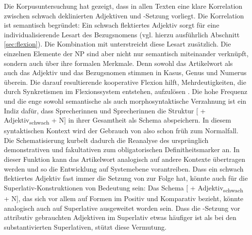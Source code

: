 Die Korpusuntersuchung hat gezeigt, dass in allen Texten eine klare Korrelation zwischen schwach deklinierten Adjektiven und -Setzung vorliegt. Die Korrelation ist semantisch begründet: Ein schwach flektiertes Adjektiv sorgt für eine individualisierende Lesart des Bezugsnomens (vgl. hierzu ausführlich Abschnitt \ref{sec:flexion}). Die Kombination mit  unterstreicht diese Lesart zusätzlich.  Die einzelnen Elemente der NP sind aber nicht nur semantisch miteinander verknüpft, sondern auch über ihre formalen Merkmale. Denn sowohl das Artikelwort als auch das Adjektiv und das Bezugsnomen stimmen in Kasus, Genus und Numerus überein. Die darauf resultierende kooperative Flexion hilft, Mehrdeutigkeiten, die durch Synkretismen im Flexionssystem entstehen, aufzulösen \parencite[127]{Szczepaniak2010}. Die hohe Frequenz und die enge sowohl semantische als auch morphosyntaktische Verzahnung ist ein Indiz dafür, dass Sprecherinnen und Sprecherinnen die Struktur [ + Adjektiv\textsubscript{schwach} + N] in ihrer Gesamtheit als Schema abspeichern. In diesem syntaktischen Kontext wird der Gebrauch von  also schon früh zum Normalfall. Die Schematisierung kurbelt dadurch die Reanalyse des ursprünglich demonstrativen und fakultativen  zum obligatorischen Definitheitsmarker an. In dieser Funktion kann das Artikelwort analogisch auf andere Kontexte übertragen werden und so die Entwicklung auf Systemebene vorantreiben. Dass ein schwach flektiertes Adjektiv fast immer die Setzung von  zur Folge hat, könnte auch für die Superlativ-Konstruktionen von Bedeutung sein: Das Schema [ + Adjektiv\textsubscript{schwach} + N], das sich vor allem auf Formen im Positiv und Komparativ bezieht, könnte analogisch auch auf Superlative ausgeweitet worden sein. Dass die -Setzung vor attributiv gebrauchten Adjektiven im Superlativ etwas häufiger ist als bei den substantivierten Superlativen,  stützt diese Vermutung. 

